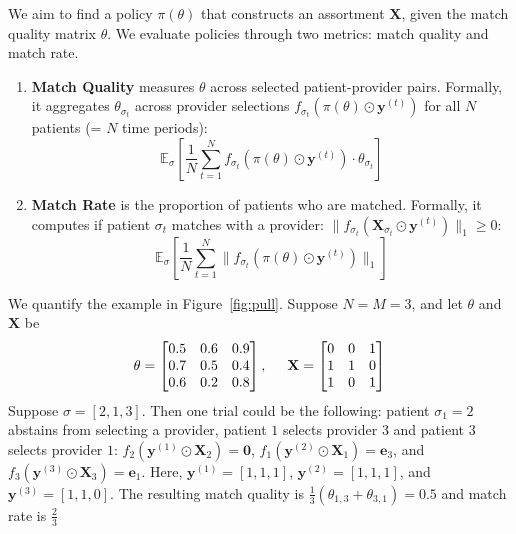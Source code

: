 We aim to find a policy $\pi(\theta)$ that constructs an assortment $\mathbf{X}$, given the match quality matrix $\theta$. 
We evaluate policies through two metrics: match quality and match rate.
\begin{enumerate}
    \item \textbf{Match Quality} measures $\theta$ across selected patient-provider pairs. Formally, it aggregates $\theta_{\sigma_{t}}$ across provider selections $f_{\sigma_{t}}(\pi(\theta) \odot \mathbf{y}^{(t)})$ for all $N$ patients (= $N$ time periods):
    \begin{equation}
       \mathbb{E}_{\sigma}[\frac{1}{N} \sum_{t=1}^{N} f_{\sigma_{t}}(\pi(\theta) \odot \mathbf{y}^{(t)}) \cdot \theta_{\sigma_{t}}]
    \end{equation}   
    \item \textbf{Match Rate} is the proportion of patients who are matched. Formally, it computes if patient $\sigma_{t}$ matches with a provider: $\lVert f_{\sigma_{t}}(\mathbf{X}_{\sigma_{t}} \odot \mathbf{y}^{(t)}) \rVert_{1} \geq 0$: 
    \begin{equation}
        \mathbb{E}_{\sigma}[\frac{1}{N} \sum_{t=1}^{N} \lVert f_{\sigma_{t}}(\pi(\theta) \odot \mathbf{y}^{(t)}) \rVert_{1}]
    \end{equation}
\end{enumerate}

\begin{example}
    We quantify the example in Figure~\ref{fig:pull}. 
    Suppose $N=M=3$, and let $\theta$ and $\mathbf{X}$ be 
    \begin{equation} 
        \theta =
        \begin{bmatrix}
        0.5 & 0.6 & 0.9 \\
        0.7 & 0.5 & 0.4 \\
        0.6 & 0.2 & 0.8
        \end{bmatrix}, \hspace{0.5cm}
        \mathbf{X} =
        \begin{bmatrix}
        0 & 0 & 1 \\
        1 & 1 & 0 \\
        1 & 0 & 1
        \end{bmatrix}
    \end{equation}
    Suppose $\sigma = [2,1,3]$. 
    Then one trial could be the following: patient $\sigma_{1}=2$ abstains from selecting a provider, patient $1$ selects provider $3$ and patient $3$ selects provider $1$: $f_{2}(\mathbf{y}^{(1)} \odot \mathbf{X}_{2}) = \mathbf{0}$, $f_{1}(\mathbf{y}^{(2)} \odot \mathbf{X}_{1}) = \mathbf{e}_{3}$, and $f_{3}(\mathbf{y}^{(3)} \odot \mathbf{X}_{3}) = \mathbf{e}_{1}$. 
    Here, $\mathbf{y}^{(1)} = [1,1,1]$, $\mathbf{y}^{(2)} = [1,1,1]$, and $\mathbf{y}^{(3)} = [1,1,0]$. The resulting match quality is $\frac{1}{3}(\theta_{1,3} + \theta_{3,1}) = 0.5$ and match rate is $\frac{2}{3}$
\end{example}


